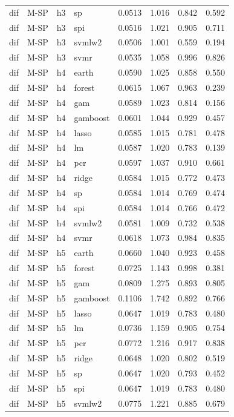 \begin{ThreePartTable}
\begin{longtable}[t]{llclcccc}
dif & M-SP & h3 & sp & 0.0513 & 1.016 & 0.842 & 0.592\\
dif & M-SP & h3 & spi & 0.0516 & 1.021 & 0.905 & 0.711\\
dif & M-SP & h3 & svmlw2 & 0.0506 & 1.001 & 0.559 & 0.194\\
dif & M-SP & h3 & svmr & 0.0535 & 1.058 & 0.996 & 0.826\\
\addlinespace
dif & M-SP & h4 & earth & 0.0590 & 1.025 & 0.858 & 0.550\\
dif & M-SP & h4 & forest & 0.0615 & 1.067 & 0.963 & 0.239\\
dif & M-SP & h4 & gam & 0.0589 & 1.023 & 0.814 & 0.156\\
dif & M-SP & h4 & gamboost & 0.0601 & 1.044 & 0.929 & 0.457\\
dif & M-SP & h4 & lasso & 0.0585 & 1.015 & 0.781 & 0.478\\
dif & M-SP & h4 & lm & 0.0587 & 1.020 & 0.783 & 0.139\\
dif & M-SP & h4 & pcr & 0.0597 & 1.037 & 0.910 & 0.661\\
dif & M-SP & h4 & ridge & 0.0584 & 1.015 & 0.772 & 0.473\\
dif & M-SP & h4 & sp & 0.0584 & 1.014 & 0.769 & 0.474\\
dif & M-SP & h4 & spi & 0.0584 & 1.014 & 0.766 & 0.472\\
dif & M-SP & h4 & svmlw2 & 0.0581 & 1.009 & 0.732 & 0.538\\
dif & M-SP & h4 & svmr & 0.0618 & 1.073 & 0.984 & 0.835\\
\addlinespace
dif & M-SP & h5 & earth & 0.0660 & 1.040 & 0.923 & 0.458\\
dif & M-SP & h5 & forest & 0.0725 & 1.143 & 0.998 & 0.381\\
dif & M-SP & h5 & gam & 0.0809 & 1.275 & 0.893 & 0.805\\
dif & M-SP & h5 & gamboost & 0.1106 & 1.742 & 0.892 & 0.766\\
dif & M-SP & h5 & lasso & 0.0647 & 1.019 & 0.783 & 0.480\\
dif & M-SP & h5 & lm & 0.0736 & 1.159 & 0.905 & 0.754\\
dif & M-SP & h5 & pcr & 0.0772 & 1.216 & 0.917 & 0.838\\
dif & M-SP & h5 & ridge & 0.0648 & 1.020 & 0.802 & 0.519\\
dif & M-SP & h5 & sp & 0.0647 & 1.020 & 0.793 & 0.452\\
dif & M-SP & h5 & spi & 0.0647 & 1.019 & 0.783 & 0.480\\
dif & M-SP & h5 & svmlw2 & 0.0775 & 1.221 & 0.885 & 0.679\\

\end{longtable}
\end{ThreePartTable}
